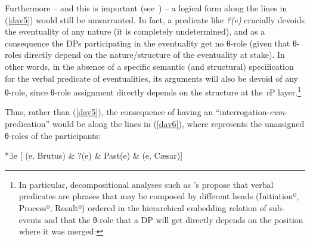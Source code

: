 \documentclass[output=paper]{langsci/langscibook}
\begin{document}
Furthermore -- and this is important (see~) -- a
logical form along the lines in (\ref{dav5}) would still be unwarranted. In
fact, a predicate like \emph{?(e)} crucially devoids the eventuality of any
nature (it is completely undetermined), and as a consequence the DPs
participating in the eventuality get no θ-role (given that
θ-roles directly depend on the nature/structure of the eventuality at
stake). In other words, in the absence of a specific semantic (and structural)
specification for the verbal predicate of eventualities, its arguments will
also be devoid of any θ-role, since θ-role assignment directly
depends on the structure at the \emph{v}P layer.\footnote{In particular,
    decompositional analyses such as \citeauthor{Ramchand2008}'s
    \citeyearpar{Ramchand2008} propose that verbal predicates are phrases that
    may be composed by different heads (Initiationº, Processº, Resultº) ordered
    in the hierarchical embedding relation of sub-events and that the
    θ-role that a DP will get directly depends on the position where it
    was merged:

}

Thus, rather than (\ref{dav5}), the consequence of having an
\enquote{interrogation-\emph{cum}-pre\-di\-ca\-tion} would be along the lines
in (\ref{dav6}), where \underline{\hspace{1cm}} represents the unassigned
θ-roles of the participants:

\begin{exe}
\ex \label{dav6} *$\exists$e [ \underline{\hspace{1cm}}(e, Brutus) \& ?(e) \& Past(e) \& \underline{\hspace{1cm}}(e, C\ae{}sar)]
\end{exe}
\end{document}
